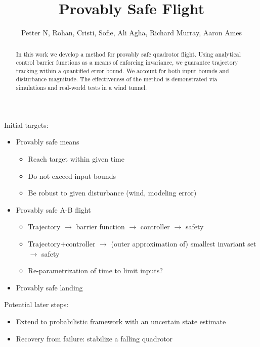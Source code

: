 \documentclass[conference]{IEEEtran}
\begin{document}
\title{\huge Provably Safe Flight }

\author{Petter N, Rohan, Cristi, Sofie, Ali Agha, Richard Murray, Aaron Ames}

\maketitle

\begin{abstract}
In this work we develop a method for provably safe quadrotor flight. Using analytical control barrier functions as a means of enforcing invariance, we guarantee trajectory tracking within a quantified error bound. We account for both input bounds and disturbance magnitude. The effectiveness of the method is demonstrated via simulations and real-world tests in a wind tunnel. 
\end{abstract}


\IEEEpeerreviewmaketitle

	

Initial targets:

\begin{itemize}
  \item Provably safe means
  \begin{itemize}
    \item Reach target within given time
    \item Do not exceed input bounds
    \item Be robust to given disturbance (wind, modeling error)
  \end{itemize}
  \item Provably safe A-B flight
  \begin{itemize}
    \item Trajectory $\rightarrow$ barrier function $\rightarrow$ controller $\rightarrow$ safety
    \item Trajectory+controller $\rightarrow$ (outer approximation of) smallest invariant set $\rightarrow$ safety
    \item Re-parametrization of time to limit inputs?
  \end{itemize}
  \item Provably safe landing
\end{itemize}

Potential later steps:
\begin{itemize}
  \item Extend to probabilistic framework with an uncertain state estimate
  \item Recovery from failure: stabilize a falling quadrotor
\end{itemize}
\end{document}
